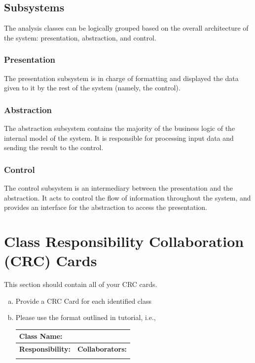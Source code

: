 \documentclass[]{article}
\begin{document}

\subsection{Subsystems}
\label{sub:subsystems}

The analysis classes can be logically grouped based on the overall architecture
of the system: presentation, abstraction, and control.

\subsubsection{Presentation}

The presentation subsystem is in charge of formatting and displayed the data given
to it by the rest of the system (namely, the control).

\subsubsection{Abstraction}

The abstraction subsystem contains the majority of the business logic of the
internal model of the system. It is responsible for processing input data and
sending the result to the control.

\subsubsection{Control}

The control subsystem is an intermediary between the presentation and the
abstraction. It acts to control the flow of information throughout the system,
and provides an interface for the abstraction to access the presentation.


	
\section{Class Responsibility Collaboration (CRC) Cards}
\label{sec:class_responsibility_collaboration_crc_cards}
This section should contain all of your CRC cards.

\begin{enumerate}[a)]
	\item Provide a CRC Card for each identified class
	\item Please use the format outlined in tutorial, i.e., 
	\begin{table}[ht]
		\centering
		\begin{tabular}{|p{5cm}|p{5cm}|}
		\hline 
		 \multicolumn{2}{|l|}{\textbf{Class Name:}} \\
		\hline
		\textbf{Responsibility:} & \textbf{Collaborators:} \\
		\hline
		\vspace{1in} & \\
		\hline
		\end{tabular}
	\end{table}
	
\end{enumerate}
\end{document}
